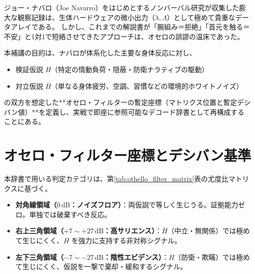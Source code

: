 ジョー・ナバロ（Joe Navarro）をはじめとするノンバーバル研究が収集した膨大な観察記録は、生体ハードウェアの微小出力（$\lambda, \Lambda$）として極めて貴重なデータアレイである。
しかし、これまでの解説書が「腕組み＝拒絶」「首元を触る＝不安」と1対1で短絡させてきたアプローチは、オセロの誤謬の温床であった。

本補講の目的は、ナバロが体系化した主要な身体反応に対し、
\begin{itemize}
  \item 検証仮説 $H$（特定の情動負荷・隠蔽・防衛ナラティブの駆動）
  \item 対立仮説 $\bar{H}$（単なる身体疲労、空調、習慣などの環境的ホワイトノイズ）
\end{itemize}
の双方を想定した**オセロ・フィルターの暫定座標（マトリクス位置と暫定デシバン値）**を定義し、実戦で即座に参照可能なデコード辞書として再構成することにある。

\section{オセロ・フィルター座標とデシバン基準}
本辞書で用いる判定カテゴリは、第\ref{tab:othello_filter_matrix}表の尤度比マトリクスに基づく。
\begin{itemize}
  \item \textbf{対角線領域（$0\,\mathrm{dB}$：ノイズフロア）}：両仮説で等しく生じうる。証拠能力ゼロ。単独では破棄すべき反応。
  \item \textbf{右上三角領域（$+7 \sim +27\,\mathrm{dB}$：高サリエンス）}：$\bar{H}$（中立・無関係）では極めて生じにくく、$H$ を強力に支持する非対称シグナル。
  \item \textbf{左下三角領域（$-7 \sim -27\,\mathrm{dB}$：陰性エビデンス）}：$H$（防衛・欺瞞）では極めて生じにくく、仮説を一撃で棄却・緩和するシグナル。
\end{itemize}

